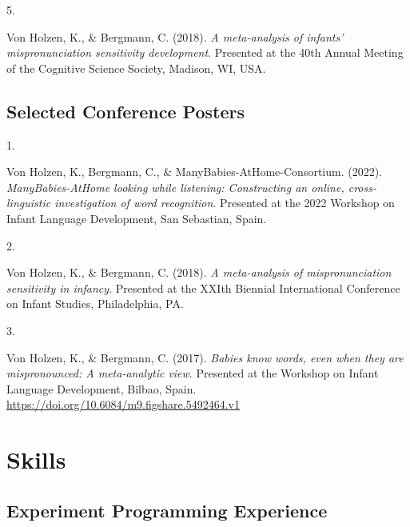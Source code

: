 \documentclass[10pt,a4paper,]{article}
\newlength{\cslhangindent}
\newlength{\csllabelwidth}
\newcommand{\CSLLeftMargin}[1]{\parbox[t]{\csllabelwidth}{\hfill #1~}}
\newcommand{\CSLRightInline}[1]{\parbox[t]{\linewidth - \cslhangindent - \csllabelwidth}{#1}\vspace{0.8ex}}
\begin{document}
\leavevmode{}%
\CSLLeftMargin{5. }%
\CSLRightInline{Von Holzen, K., \& Bergmann, C. (2018). \emph{A
meta-analysis of infants' mispronunciation sensitivity development}.
Presented at the 40th Annual Meeting of the Cognitive Science Society,
Madison, WI, USA.}

\hypertarget{selected-conference-posters}{%
\subsection{Selected Conference
Posters}\label{selected-conference-posters}}

\hypertarget{bibliography}{}
\leavevmode{}%
\CSLLeftMargin{1. }%
\CSLRightInline{Von Holzen, K., Bergmann, C., \&
ManyBabies-AtHome-Consortium. (2022). \emph{ManyBabies-AtHome looking
while listening: Constructing an online, cross-linguistic investigation
of word recognition}. Presented at the 2022 Workshop on Infant Language
Development, San Sebastian, Spain.}

\leavevmode{}%
\CSLLeftMargin{2. }%
\CSLRightInline{Von Holzen, K., \& Bergmann, C. (2018). \emph{A
meta-analysis of mispronunciation sensitivity in infancy}. Presented at
the XXIth Biennial International Conference on Infant Studies,
Philadelphia, PA.}

\leavevmode{}%
\CSLLeftMargin{3. }%
\CSLRightInline{Von Holzen, K., \& Bergmann, C. (2017). \emph{Babies
know words, even when they are mispronounced: A meta-analytic view}.
Presented at the Workshop on Infant Language Development, Bilbao, Spain.
\url{https://doi.org/10.6084/m9.figshare.5492464.v1}}

\hypertarget{skills}{%
\section{Skills}\label{skills}}

\hypertarget{experiment-programming-experience}{%
\subsection{Experiment Programming
Experience}\label{experiment-programming-experience}}
\end{document}
